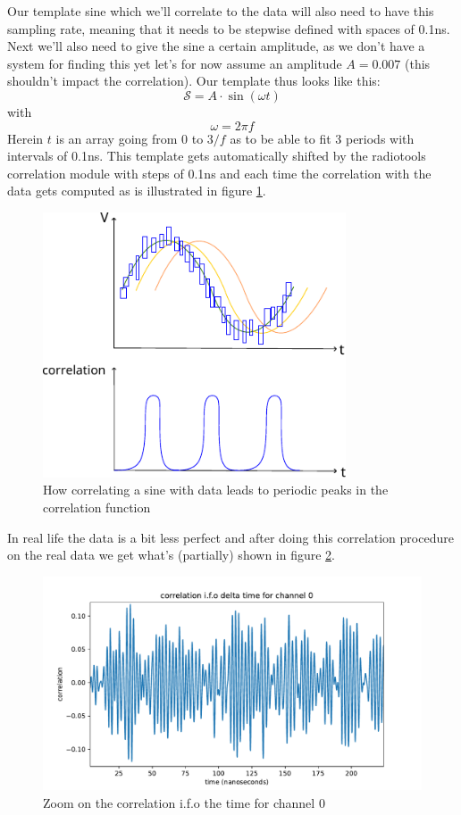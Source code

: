 \documentclass[11pt,a4paper,faculty=we,language=en,doctype=report]{cls/ugent-doc}
\begin{document}
Our template sine which we'll correlate to the data will also need to have this
sampling rate, meaning that it needs to be stepwise defined with spaces of
0.1ns. Next we'll also need to give the sine a certain amplitude, as we don't
have a system for finding this yet let's for now assume an amplitude $A =
0.007$ (this shouldn't impact the correlation).  Our template thus looks like
this:
\begin{equation}
	\mathcal{S} = A\cdot\sin(\omega t) 
\end{equation}
with
\begin{equation}
	\omega = 2\pi f
\end{equation}
Herein $t$ is an array going from 0 to $3/f$ as to be able to fit 3 periods
with intervals of 0.1ns.  This template gets automatically shifted by the radiotools
correlation module with steps of 0.1ns and each time the correlation with the
data gets computed as is illustrated in figure \ref{fig:SineCorrFull}.
\begin{figure}
	\centering
	\includegraphics[width=0.8\textwidth]{figures/SineDataCorrFull.pdf}
	\caption{How correlating a sine with data leads to periodic peaks in the correlation function}
	\label{fig:SineCorrFull}
\end{figure}
In real life the data is a bit less perfect and after doing this correlation
procedure on the real data we get what's (partially) shown in figure
\ref{fig:CorrCh0}.
\begin{figure}
	\centering
	\includegraphics[width=\textwidth]{figures/CorrelationCh0.pdf}
	\caption{Zoom on the correlation i.f.o the time for channel 0}
	\label{fig:CorrCh0}
\end{figure}
\end{document}
